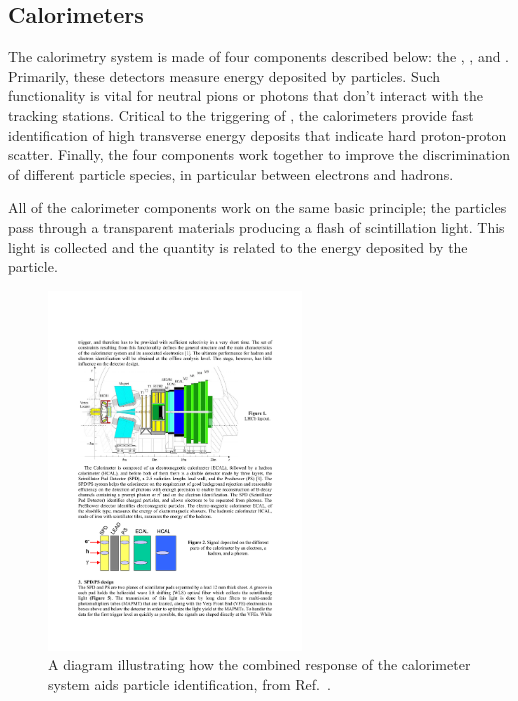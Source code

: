 \subsection{Calorimeters}

The calorimetry system is made of four components described below: the \spd, \presh, \ecal and \hcal.
Primarily, these detectors measure energy deposited by particles. Such functionality is vital for neutral pions or photons that don't interact with the tracking stations. Critical to the triggering of \lhcb, the calorimeters provide fast identification of high transverse energy deposits that indicate hard proton-proton scatter. Finally, the four components work together to improve the discrimination of different particle species, in particular between electrons and hadrons. 



All of the calorimeter components work on the same basic principle; the particles pass through a transparent materials producing a flash of scintillation light. This light is collected and the quantity is related to the energy deposited by the particle.  



\begin{figure}[!h]
    \centering
    \includegraphics[width=0.6\textwidth]{figs/Detector/calo_layout.pdf}
    \caption{A diagram illustrating how the combined response of the calorimeter system aids particle identification, from Ref.~\cite{1742-6596-293-1-012059}.}
    \label{fig:Dec_calo_layout}   
\end{figure}


